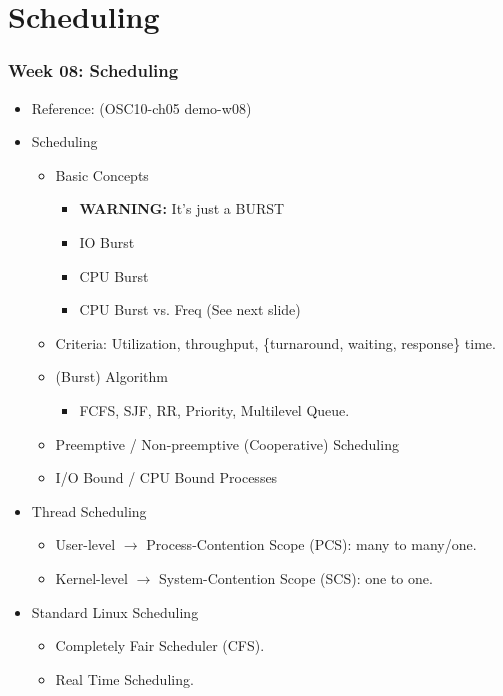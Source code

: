 \documentclass[xcolor=table, notheorems, hyperref={pdfpagelabels=false}]{beamer}
\begin{document}
\section{Scheduling}
\begin{frame}
\frametitle{Week 08: Scheduling}
\begin{itemize}
\item Reference: (OSC10-ch05 demo-w08)
\item Scheduling
\begin{itemize}
\item Basic Concepts
\begin{itemize}
\item \textbf{WARNING:} It's just a BURST
\item IO Burst
\item CPU Burst
\item CPU Burst vs. Freq (See next slide)
\end{itemize}
\item Criteria: Utilization, throughput, \{turnaround, waiting,  response\} time.
\item (Burst) Algorithm
\begin{itemize}
\item FCFS, SJF, RR, Priority, Multilevel Queue.
\end{itemize}
\item Preemptive / Non-preemptive (Cooperative) Scheduling
\item I/O Bound / CPU Bound Processes
\end{itemize}
\item Thread Scheduling
\begin{itemize}
\item User-level $\rightarrow$ Process-Contention Scope (PCS): many to many/one.
\item Kernel-level $\rightarrow$ System-Contention Scope (SCS): one to one.
\end{itemize}
\item Standard Linux Scheduling
\begin{itemize}
\item Completely Fair Scheduler (CFS).
\item Real Time Scheduling.
\end{itemize}
\end{itemize}
\end{frame}

\end{document}

